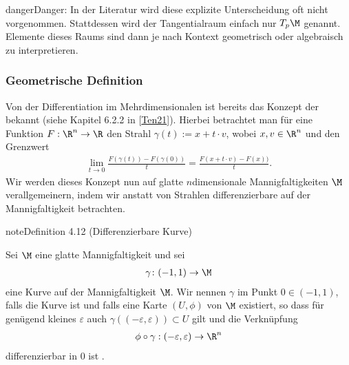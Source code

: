 \documentclass[letterpaper,10pt,english]{jupyterBook}
\begin{document}
\begin{sphinxadmonition}{danger}{Danger:}
\sphinxAtStartPar
In der Literatur wird diese explizite Unterscheidung oft nicht vorgenommen.
Stattdessen wird der Tangentialraum einfach nur \(T_p\M\) genannt.
Elemente dieses Raums sind dann je nach Kontext geometrisch oder algebraisch zu interpretieren.
\end{sphinxadmonition}


\subsubsection{Geometrische Definition}
\label{\detokenize{manifolds/tangential:geometrische-definition}}
\sphinxAtStartPar
Von der Differentiation im Mehrdimensionalen ist bereits das Konzept der  bekannt (siehe Kapitel 6.2.2 in {[}\hyperlink{cite.references:id12}{Ten21}{]}).
Hierbei betrachtet man für eine Funktion \(F:\R^n\to\R\) den Strahl \(\gamma(t):= x + t\cdot v\), wobei \(x,v\in\R^n\) und den Grenzwert
\begin{equation*}
\begin{split}\lim_{t\to 0} \frac{F(\gamma(t)) - F(\gamma(0))}{t} = \frac{F(x + t\cdot v) - F(x))}{t}.\end{split}
\end{equation*}
\sphinxAtStartPar
Wir werden dieses Konzept nun auf glatte \(n\)\sphinxhyphen{}dimensionale Mannigfaltigkeiten \(\M\) verallgemeinern, indem wir anstatt von Strahlen differenzierbare  auf der Mannigfaltigkeit betrachten.
\label{manifolds/tangential:definition-1}
\begin{sphinxadmonition}{note}{Definition 4.12 (Differenzierbare Kurve)}



\sphinxAtStartPar
Sei \(\M\) eine glatte Mannigfaltigkeit und sei
\begin{equation*}
\begin{split}\gamma \colon (-1,1) \rightarrow \M\end{split}
\end{equation*}
\sphinxAtStartPar
eine Kurve auf der Mannigfaltigkeit \(\M\).
Wir nennen \(\gamma\)  im Punkt \(0\in(-1,1)\), falls die Kurve  ist und falls eine Karte \((U,\phi)\) von \(\M\) existiert, so dass für genügend kleines \(\varepsilon\) auch \(\gamma((-\varepsilon,\varepsilon))\subset U\) gilt und die Verknüpfung
\begin{equation*}
\begin{split}\phi \circ \gamma:(-\varepsilon,\varepsilon)\to\R^n\end{split}
\end{equation*}
\sphinxAtStartPar
differenzierbar in \(0\) ist .
\end{sphinxadmonition}
\end{document}
